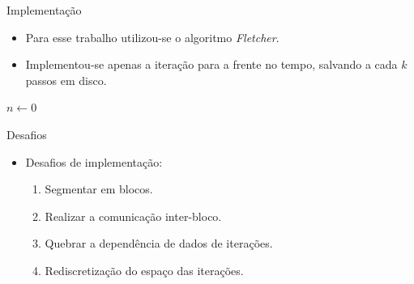 \documentclass{beamer}
\begin{document}
\begin{frame}[fragile]{Implementação}
  \begin{itemize}
  \item<+-> Para esse trabalho utilizou-se o algoritmo \textit{Fletcher}.
  \item<+-> Implementou-se apenas a iteração para a frente no tempo, salvando a cada $k$ passos em disco.
  \end{itemize}

\scriptsize
  \begin{algorithm}[H]
    \SetAlgoLined
\DontPrintSemicolon
{}


\BlankLine
$n \longleftarrow 0$\;
  \end{algorithm}


\end{frame}

\begin{frame}{Desafios}
  \begin{itemize}
  \item<+-> Desafios de implementação:
    \begin{enumerate}
    \item<+-> Segmentar em blocos.
    \item<+-> Realizar a comunicação inter-bloco.
    \item<+-> Quebrar a dependência de dados de iterações.
    \item<+-> Rediscretização do espaço das iterações.
    \end{enumerate}
  \end{itemize}
\end{frame}
\end{document}
